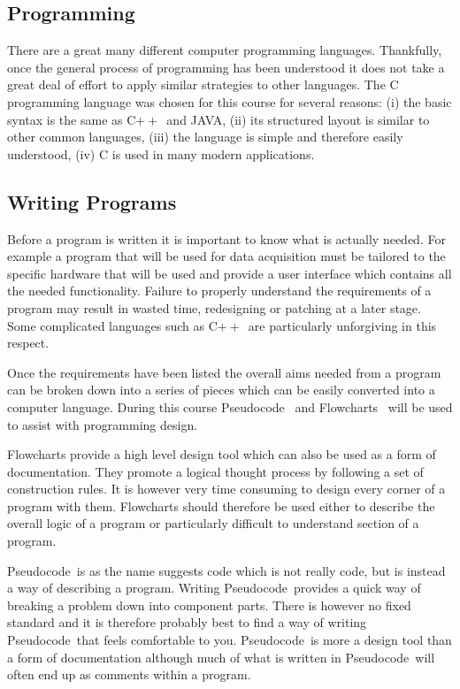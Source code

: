 \documentclass[11pt]{scrartcl}
\def\cpp{C$++$}
\def\psc{Pseudocode}
\begin{document}
\subsection{Programming}
There are a great many different computer programming languages.  Thankfully, once the general process of programming has been understood it does not take a great deal of effort to apply similar strategies to other languages.  The C programming language was chosen for this course for several reasons: (i) the basic syntax is the same as \cpp\ and JAVA, (ii) its structured layout is similar to other common languages, (iii) the language is simple and therefore easily understood, (iv) C is used in many modern applications.

\subsection{Writing Programs} %
Before a program is written it is important to know what is actually
needed.  For example a program that will be used for data acquisition
must be tailored to the specific hardware that will be used and
provide a user interface which contains all the needed functionality.
Failure to properly understand the requirements of a program  
may result in wasted time, redesigning or patching at a
later stage.  Some complicated languages such as \cpp\ are particularly
unforgiving in this respect.

Once the requirements have been listed the overall aims needed from a
program can be broken down into a series of pieces which can be easily
converted into a computer language.  During this course
\psc~\cite{pseudocodewiki} and Flowcharts~\cite{flowchartwiki}
will be used to assist with programming design.

Flowcharts provide a high level design tool which can also be used as
a form of documentation.  They promote a logical thought process by
following a set of construction rules.  It is however very time
consuming to design every corner of a program with them.  Flowcharts
should therefore be used either to describe the overall logic of a
program or particularly difficult to understand section of a program.

\psc\ is as the name suggests code which is not really code, but
is instead a way of describing a program.  Writing \psc\ provides
a quick way of breaking a problem down into component parts.  There is
however no fixed standard and it is therefore probably best to find a
way of writing \psc\ that feels comfortable to you.  \psc\
is more a design tool than a form of documentation although much of
what is written in \psc\ will often end up as comments within a
program.
\end{document}
